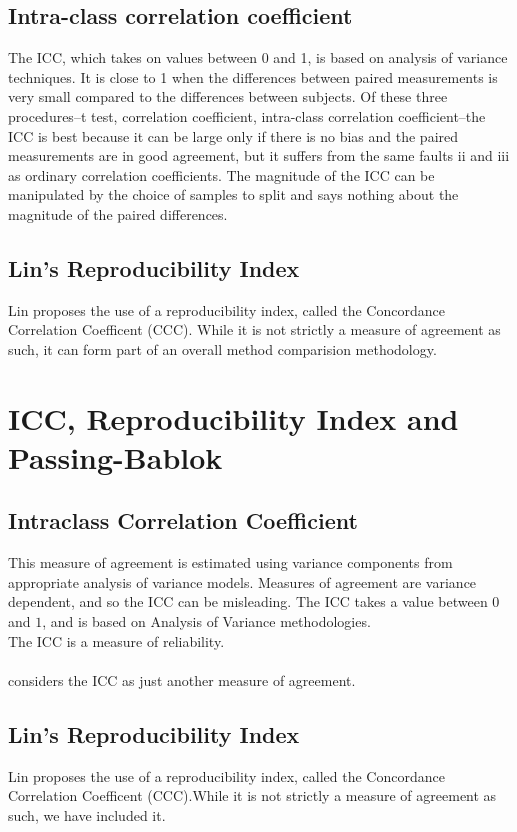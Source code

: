 	
	\subsection*{Intra-class correlation coefficient}
	
	The ICC, which takes on values between 0 and 1, is based on analysis of variance techniques. It is close to 1 when the differences between paired measurements is very small compared to the differences between subjects. Of these three procedures--t test, correlation coefficient, intra-class correlation coefficient--the ICC is best because it can be large only if there is no bias and the paired measurements are in good agreement, but it suffers from the same faults ii and iii as ordinary correlation coefficients. The magnitude of the ICC can be manipulated by the choice of samples to split and says nothing about the magnitude of the paired differences.
	
	
	\subsection{Lin's Reproducibility Index} Lin proposes the use of a
	reproducibility index, called the Concordance Correlation
	Coefficent (CCC). While it is not strictly a measure of agreement
	as such, it can form part of an overall method comparision
	methodology.

\section{ICC, Reproducibility Index and Passing-Bablok }


\subsection{Intraclass Correlation Coefficient} This measure of agreement is estimated using variance components from appropriate analysis of variance models. Measures of agreement are variance dependent, and so the ICC can be misleading. The ICC takes a value between $0$ and $1$, and is based on Analysis of Variance
methodologies.
\\
The ICC is a measure of reliability.
\\
\\\citet{bartko} considers the ICC as just another measure of agreement.



\subsection{Lin's Reproducibility Index} Lin proposes the use of a reproducibility index, called the Concordance Correlation Coefficent (CCC).While it is not strictly a measure of agreement as such, we have included it.






